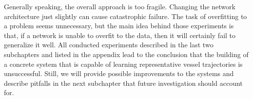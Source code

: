 Generally speaking, the overall approach is too fragile. Changing the network architecture just slightly can cause catastrophic failure. The task of overfitting to a problem seems unnecessary, but the main idea behind those experiments is that, if a network is unable to overfit to the data, then it will certainly fail to generalize it well. All conducted experiments described in the last two subchapters and listed in the appendix lead to the conclusion that the building of a concrete system that is capable of learning representative vessel trajectories is unsuccessful. Still, we will provide possible improvements to the systems and describe pitfalls in the next subchapter that future investigation should account for.